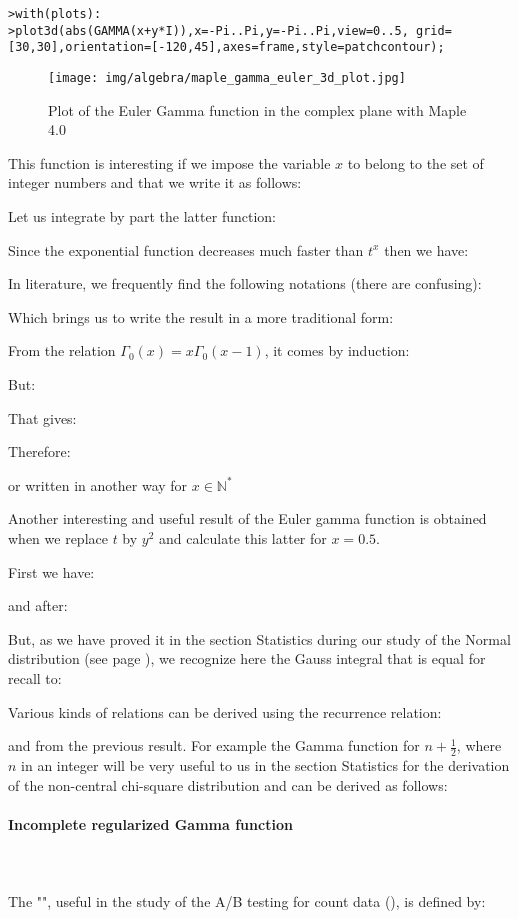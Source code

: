 	\texttt{>with(plots):\\}
	\texttt{>plot3d(abs(GAMMA(x+y*I)),x=-Pi..Pi,y=-Pi..Pi,view=0..5, grid=[30,30],orientation=[-120,45],axes=frame,style=patchcontour);}
	
	\begin{figure}[H]
		\centering
		\texttt{[image: img/algebra/maple\_gamma\_euler\_3d\_plot.jpg]}
		\caption{Plot of the Euler Gamma function in the complex plane with Maple 4.0}
	\end{figure}
	This function is interesting if we impose the variable $x$ to belong to the set of integer numbers and that we write it as follows:
	
	Let us integrate by part the latter function:
	
	Since the exponential function decreases much faster than $t^x$ then we have:
	
	In literature, we frequently find the following notations (there are confusing):
	
	Which brings us to write the result in a more traditional form:
	
	From the relation $\Gamma_{0}(x)=x\Gamma_{0}(x-1)$, it comes by induction:
	
	But:
	
	That gives:
	
	Therefore:
	
	or written in another way for $x\in \mathbb{N}^*$
	
	Another interesting and useful result of the Euler gamma function is obtained when we replace $t$ by $y^2$ and calculate this latter for $x=0.5$.
	
	First we have:
	
	and after:
	
	But, as we have proved it in the section Statistics during our study of the Normal distribution (see page \pageref{Gauss integral}), we recognize here the Gauss integral that is equal for recall to:
	
	Various kinds of relations can be derived using the recurrence relation:
	
	and from the previous result. For example the Gamma function for $n+\frac{1}{2}$, where $n$ in an integer will be very useful to us in the section Statistics for the derivation of the non-central chi-square distribution and can be derived as follows:
	
	
	\paragraph{Incomplete regularized Gamma function}\label{incomplete regularized Gamma function}\mbox{}\\\\
	The "", useful in the study of the A/B testing for count data (), is defined by:
	
